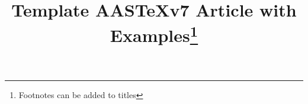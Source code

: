 \documentclass[linenumbers,trackchanges]{aastex7}
\newcommand\aastex{AAS\TeX}
\begin{document}
\title{Template \aastex v7 Article with Examples\footnote{Footnotes can be added to titles}}

\end{document}
